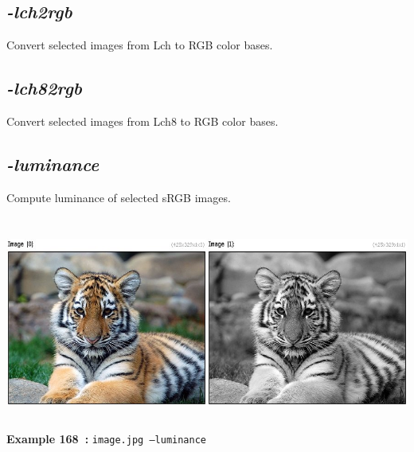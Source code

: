 \documentclass[a4paper,11pt,twoside]{book}
\begin{document}
\subsection{\emph{-lch2rgb} }\vspace*{-0.5em}
Convert selected images from Lch to RGB color bases.


\subsection{\emph{-lch82rgb} }\vspace*{-0.5em}
Convert selected images from Lch8 to RGB color bases.


\subsection{\emph{-luminance} }\vspace*{-0.5em}
Compute luminance of selected sRGB images.
\begin{center}\includegraphics[keepaspectratio=true,height=7cm,width=\textwidth]{img/gmic_def168.jpg}\\
{\footnotesize \textbf{Example 168~:} \texttt{image.jpg --luminance}}
\end{center}
\end{document}

